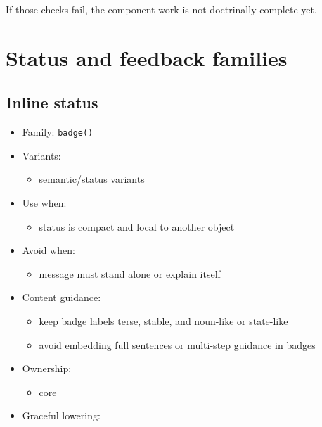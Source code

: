 If those checks fail, the component work is not doctrinally complete yet.

\section{Status and feedback families}\label{record-019-status-and-feedback-families}

\subsection{Inline status}\label{record-019-inline-status}

\begin{itemize}
\tightlist
\item
  Family: \texttt{b\allowbreak{}a\allowbreak{}d\allowbreak{}g\allowbreak{}e\allowbreak{}(\allowbreak{})}
\item
  Variants:

  \begin{itemize}
  \tightlist
  \item
    semantic/status variants
  \end{itemize}
\item
  Use when:

  \begin{itemize}
  \tightlist
  \item
    status is compact and local to another object
  \end{itemize}
\item
  Avoid when:

  \begin{itemize}
  \tightlist
  \item
    message must stand alone or explain itself
  \end{itemize}
\item
  Content guidance:

  \begin{itemize}
  \tightlist
  \item
    keep badge labels terse, stable, and noun-like or state-like
  \item
    avoid embedding full sentences or multi-step guidance in badges
  \end{itemize}
\item
  Ownership:

  \begin{itemize}
  \tightlist
  \item
    core
  \end{itemize}
\item
  Graceful lowering:


\end{itemize}
